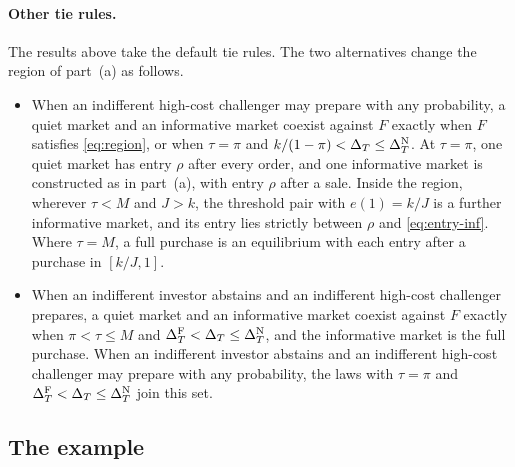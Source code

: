 \paragraph{Other tie rules.}
The results above take the default tie rules. The two alternatives change the region of part~(a) as follows.
\begin{itemize}[leftmargin=2em]
\item When an indifferent high-cost challenger may prepare with any probability, a quiet market and an informative
market coexist against \(F\) exactly when \(F\) satisfies \eqref{eq:region}, or when \(\tau=\pi\) and
\(k/(1-\pi)<\Delta_T\le\Delta_T^{\rm N}\). At \(\tau=\pi\), one quiet market has entry \(\rho\) after every order, and one
informative market is constructed as in part~(a), with entry \(\rho\) after a sale. Inside the region, wherever \(\tau<M\)
and \(J>k\), the threshold pair with \(e(1)=k/J\) is a further informative market, and its entry lies strictly between
\(\rho\) and \eqref{eq:entry-inf}. Where \(\tau=M\), a full purchase is an equilibrium with each entry after a purchase
in \([k/J,1]\).
\item When an indifferent investor abstains and an indifferent high-cost challenger prepares, a quiet market and an
informative market coexist against \(F\) exactly when \(\pi<\tau\le M\) and \(\Delta_T^{\rm F}<\Delta_T\le\Delta_T^{\rm N}\), and the
informative market is the full purchase. When an indifferent investor abstains and an indifferent high-cost challenger
may prepare with any probability, the laws with \(\tau=\pi\) and \(\Delta_T^{\rm F}<\Delta_T\le\Delta_T^{\rm N}\) join this set.
\end{itemize}

\subsection*{The example}

